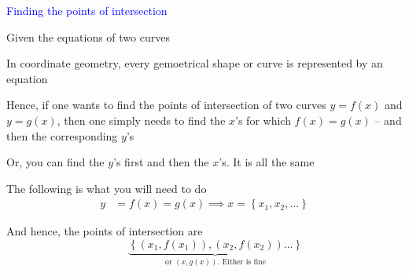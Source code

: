 \documentclass[14pt,fleqn]{extarticle}
\begin{document}
 

\begin{skill}
\textcolor{blue}{Finding the points of intersection}

Given the equations of two curves 
\end{skill}

\newcard 

In coordinate geometry, every gemoetrical shape or curve is represented by an equation \newline 


Hence, if one wants to find the points of intersection of two curves $y=f(x)$ and $y=g(x)$, then one simply needs to find the $x$'s for which $f(x) = g(x)$ -- and then the corresponding $y$'s \newline 

Or, you can find the $y$'s first and then the $x$'s. It is all the same \newline 

The following is what you will need to do  
\begin{align}
	y &= f(x) = g(x) \implies x = \left\lbrace x_1, x_2, \ldots\right\rbrace	
\end{align}

And hence, the points of intersection are 
\[ \qquad \underbrace{\left\lbrace\left(x_1, f(x_1) \right), \left(x_2, f(x_2) \right)\ldots\right\rbrace}_{\text{or }\left(x,g(x) \right).\text{ Either is fine}} \] 
\end{document}
